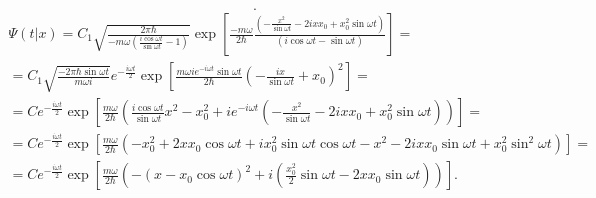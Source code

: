 \documentclass[a4paper]{article}
\begin{document}
\begin{sol}
\[.\] 
\begin{multline*}
	\Psi (t|x)= C_1 \sqrt{ \frac{2\pi \hbar }{- m\omega
	\left( \frac{i \cos  \omega t}{\sin \omega t}-1 \right) }}\exp  \left[ 
\frac{-m\omega}{2\hbar } \frac{\left( -\frac{x^2}{\sin \omega t}-2 i x x_0+x_0^2 \sin \omega t \right) }{\left( 
i \cos  \omega t -\sin  \omega t\right) }\right]  =\\=
C_1 \sqrt{\frac{-2\pi \hbar  \sin \omega t}{m\omega i}} 
e^{-\frac{i \omega t}{2}} \exp 
\left[ \frac{m\omega i e^{-i\omega t}\sin \omega t}{2\hbar }
\left( - \frac{ix}{\sin \omega t}+x_0 \right) ^2\right] =\\=
C e^{- \frac{i \omega t}{2}} \exp \left[ 
\frac{m\omega}{2\hbar }\left( 
\frac{i \cos \omega t}{\sin  \omega t}x^2-x_0^2
+i e^{-i\omega t}\left( 
-\frac{x^2}{\sin  \omega t}-2 i x x_0 +x_0^2 \sin \omega t\right) \right) \right]  =\\=
C e^{- \frac{i\omega t}{2}} \exp \left[ 
\frac{m\omega }{2\hbar }\left( -x_0^2+
2x x_0 \cos \omega t +i x_0^2 \sin \omega t \cos \omega t-
x^2 - 2 i x x_0 \sin \omega t+x_0^2 \sin ^2 \omega t\right) \right] =
\\=C e^{- \frac{i\omega t}{2}} \exp \left[ 
\frac{m\omega}{2\hbar } \left( 
-(x-x_0 \cos \omega t)^2+ i
\left( \frac{x_0^2}{2} \sin  \omega t- 2 x x_0 \sin \omega t \right) \right) \right] 
.\end{multline*} 
\end{sol}
\end{document}
